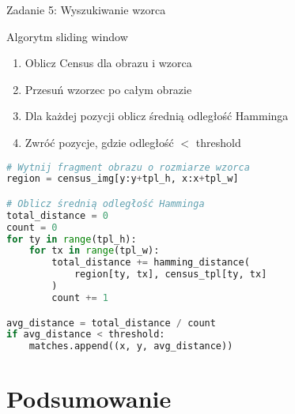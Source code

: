 \documentclass[9pt]{beamer}
\begin{document}
\begin{frame}[fragile]{Zadanie 5: Wyszukiwanie wzorca}
\begin{block}{Algorytm sliding window}
\begin{enumerate}
\item Oblicz Census dla obrazu i wzorca
\item Przesuń wzorzec po całym obrazie
\item Dla każdej pozycji oblicz średnią odległość Hamminga
\item Zwróć pozycje, gdzie odległość $<$ threshold
\end{enumerate}
\end{block}

\begin{lstlisting}[language=Python, basicstyle=\tiny\ttfamily, caption={Fragment kluczowy}]
# Wytnij fragment obrazu o rozmiarze wzorca
region = census_img[y:y+tpl_h, x:x+tpl_w]

# Oblicz średnią odległość Hamminga
total_distance = 0
count = 0
for ty in range(tpl_h):
    for tx in range(tpl_w):
        total_distance += hamming_distance(
            region[ty, tx], census_tpl[ty, tx]
        )
        count += 1

avg_distance = total_distance / count
if avg_distance < threshold:
    matches.append((x, y, avg_distance))
\end{lstlisting}

\end{frame}

\section{Podsumowanie}
\end{document}
